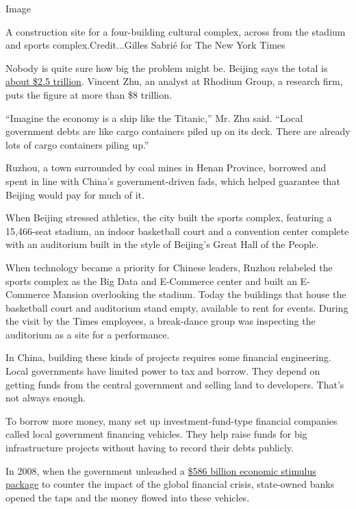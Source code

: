 Image

A construction site for a four-building cultural complex, across from
the stadium and sports complex.Credit...Gilles Sabrié for The New York
Times

Nobody is quite sure how big the problem might be. Beijing says the
total is
\href{http://yss.mof.gov.cn/zhuantilanmu/dfzgl/sjtj/201904/t20190403_3211696.html}{about
\$2.5 trillion}. Vincent Zhu, an analyst at Rhodium Group, a research
firm, puts the figure at more than \$8 trillion.

``Imagine the economy is a ship like the Titanic,'' Mr. Zhu said.
``Local government debts are like cargo containers piled up on its deck.
There are already lots of cargo containers piling up.''

Ruzhou, a town surrounded by coal mines in Henan Province, borrowed and
spent in line with China's government-driven fads, which helped
guarantee that Beijing would pay for much of it.

When Beijing stressed athletics, the city built the sports complex,
featuring a 15,466-seat stadium, an indoor basketball court and a
convention center complete with an auditorium built in the style of
Beijing's Great Hall of the People.

When technology became a priority for Chinese leaders, Ruzhou relabeled
the sports complex as the Big Data and E-Commerce center and built an
E-Commerce Mansion overlooking the stadium. Today the buildings that
house the basketball court and auditorium stand empty, available to rent
for events. During the visit by the Times employees, a break-dance group
was inspecting the auditorium as a site for a performance.

In China, building these kinds of projects requires some financial
engineering. Local governments have limited power to tax and borrow.
They depend on getting funds from the central government and selling
land to developers. That's not always enough.

To borrow more money, many set up investment-fund-type financial
companies called local government financing vehicles. They help raise
funds for big infrastructure projects without having to record their
debts publicly.

In 2008, when the government unleashed a
\href{https://www.nytimes.com/2008/11/10/world/asia/10china.html}{\$586
billion economic stimulus package} to counter the impact of the global
financial crisis, state-owned banks opened the taps and the money flowed
into these vehicles.

